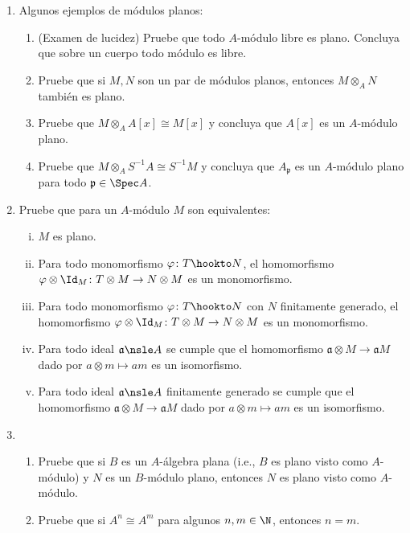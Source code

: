 \documentclass[11pt, reqno]{amsart}
\begin{document}
\begin{enumerate}
	\item Algunos ejemplos de módulos planos:
		\begin{enumerate}
			\item (Examen de lucidez) Pruebe que todo $A$-módulo libre es plano.
				Concluya que sobre un cuerpo todo módulo es libre.
			\item Pruebe que si $M, N$ son un par de módulos planos, entonces $M\otimes_A N$ también
				es plano.
			\item Pruebe que $M \otimes_A A[x] \cong M[x]$ y concluya que $A[x]$ es un $A$-módulo plano.
			\item Pruebe que $M \otimes_A S^{-1}A \cong S^{-1}M$ y concluya que $A_{\mathfrak{p}}$ es un
				$A$-módulo plano para todo $\mathfrak{p} \in \Spec A$.
		\end{enumerate}

	\item Pruebe que para un $A$-módulo $M$ son equivalentes:
		\begin{enumerate}[(i)]
			\item $M$ es plano.
			\item Para todo monomorfismo $\varphi \colon T \hookto N$, el homomorfismo $\varphi\otimes\Id_M
				\colon T\otimes M \to N\otimes M$ es un monomorfismo.
			\item Para todo monomorfismo $\varphi \colon T \hookto N$ con $N$ finitamente generado, el
				homomorfismo $\varphi\otimes\Id_M \colon T\otimes M \to N\otimes M$ es un monomorfismo.
			\item Para todo ideal $\mathfrak{a} \nsle A$ se cumple que el homomorfismo $\mathfrak{a}\otimes
				M \to \mathfrak{a}M$ dado por $a\otimes m \mapsto am$ es un isomorfismo.
			\item Para todo ideal $\mathfrak{a} \nsle A$ finitamente generado se cumple que el homomorfismo $\mathfrak{a}\otimes
				M \to \mathfrak{a}M$ dado por $a\otimes m \mapsto am$ es un isomorfismo.
		\end{enumerate}

	\item
		\begin{enumerate}
			\item Pruebe que si $B$ es un $A$-álgebra plana (i.e., $B$ es plano visto como
				$A$-módulo) y $N$ es un $B$-módulo plano, entonces $N$ es plano visto como
				$A$-módulo.
			\item\lookright
				Pruebe que si $A^n \cong A^m$ para algunos $n, m \in \N$, entonces $n = m$.


\end{enumerate}
\end{enumerate}
\end{document}

